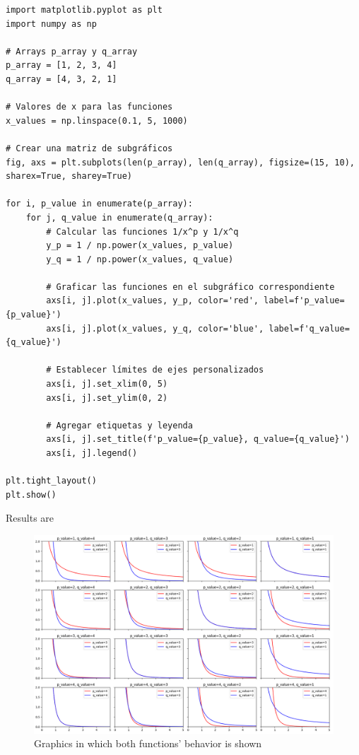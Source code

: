 \documentclass{article}
\begin{document}
\begin{verbatim}
import matplotlib.pyplot as plt
import numpy as np

# Arrays p_array y q_array
p_array = [1, 2, 3, 4]
q_array = [4, 3, 2, 1]

# Valores de x para las funciones
x_values = np.linspace(0.1, 5, 1000)

# Crear una matriz de subgráficos
fig, axs = plt.subplots(len(p_array), len(q_array), figsize=(15, 10), sharex=True, sharey=True)

for i, p_value in enumerate(p_array):
    for j, q_value in enumerate(q_array):
        # Calcular las funciones 1/x^p y 1/x^q
        y_p = 1 / np.power(x_values, p_value)
        y_q = 1 / np.power(x_values, q_value)
        
        # Graficar las funciones en el subgráfico correspondiente
        axs[i, j].plot(x_values, y_p, color='red', label=f'p_value={p_value}')
        axs[i, j].plot(x_values, y_q, color='blue', label=f'q_value={q_value}')
        
        # Establecer límites de ejes personalizados
        axs[i, j].set_xlim(0, 5)
        axs[i, j].set_ylim(0, 2)
        
        # Agregar etiquetas y leyenda
        axs[i, j].set_title(f'p_value={p_value}, q_value={q_value}')
        axs[i, j].legend()

plt.tight_layout()
plt.show()
\end{verbatim}

Results are

\begin{figure}[h]
  \centering
  \includegraphics[width=1.3\textwidth]{graficas.png}
  \caption{Graphics in which both functions' behavior is shown}
  \label{fig:etiqueta}
\end{figure}
\end{document}
